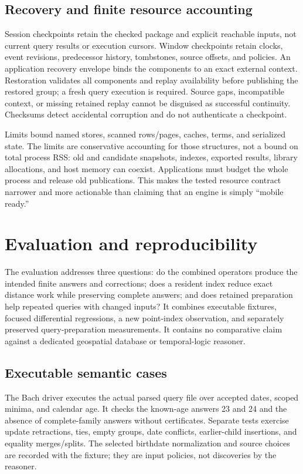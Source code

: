 \documentclass{article}
\begin{document}
\subsection{Recovery and finite resource accounting}
Session checkpoints retain the checked package and explicit reachable inputs,
not current query results or execution cursors. Window checkpoints retain clocks,
event revisions, predecessor history, tombstones, source offsets, and policies.
An application recovery envelope binds the components to an exact external
context. Restoration validates all components and replay availability before
publishing the restored group; a fresh query execution is required. Source
gaps, incompatible context, or missing retained replay cannot be disguised as
successful continuity. Checksums detect accidental corruption and do not
authenticate a checkpoint.

Limits bound named stores, scanned rows/pages, caches, terms, and serialized
state. The limits are conservative accounting for those structures, not a bound
on total process RSS: old and candidate snapshots, indexes, exported results,
library allocations, and host memory can coexist. Applications must budget the
whole process and release old publications. This makes the tested resource
contract narrower and more actionable than claiming that an engine is simply
``mobile ready.''

\section{Evaluation and reproducibility}
\label{sec:evaluation}
The evaluation addresses three questions: do the combined operators produce the
intended finite answers and corrections; does a resident index reduce exact
distance work while preserving complete answers; and does retained preparation
help repeated queries with changed inputs? It combines executable fixtures,
focused differential regressions, a new point-index observation, and separately
preserved query-preparation measurements. It contains no comparative claim
against a dedicated geospatial database or temporal-logic reasoner.

\subsection{Executable semantic cases}
The Bach driver executes the actual parsed query file over accepted dates,
scoped minima, and calendar age. It checks the known-age answers 23 and 24
and the absence of complete-family answers without certificates. Separate
tests exercise update retractions, ties, empty groups, date conflicts,
earlier-child insertions, and equality merges/splits. The selected birthdate
normalization and source choices are recorded with the fixture; they are input
policies, not discoveries by the reasoner.
\end{document}
